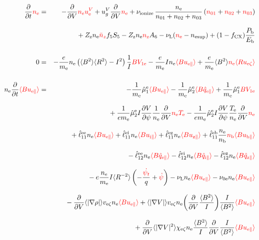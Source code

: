 \documentclass[11pt]{article}
\def\r#1{{\rm#1}}
\def\aves#1{\langle#1\rangle}
\def\dd#1#2{\frac{\partial #1}{\partial #2}}
\def\para{\parallel}
\def\ddV{\frac{\partial}{\partial V}}
\def\ddt{\frac{\partial}{\partial t}}
\def\psid{\dot{\psi}}
\def\psit{\psi_t}
\def\psitd{\dot{\psit}}
\def\me{m_\r{e}}
\def\nee{n_\r{e}}
\def\nz{n_\r{z}}
\def\nb{n_\r{b}}
\def\Te{T_\r{e}}
\def\Zz{Z_\r{z}}
\def\uzt#1{u_{\r{#1}\zeta}}
\def\upara#1{u_{\r{#1}\para}}
\def\qhatpara#1{\hat{q}_{\r{#1}\para}}
\def\uV#1{u_\r{#1}^V}
\def\ugV{u_{g}^V}
\def\chis#1{\chi_\r{#1}}
\def\nun#1{\nu_\r{0#1}}
\def\nsup#1{n_\r{#1sup}}
\def\bri{\aves{B^2}\aves{R^2} - I^2}
\def\Pb{P_\r{b}}
\def\Eb{E_\r{b}}
\def\nna{n_{01}}
\def\nnb{n_{02}}
\def\nnc{n_{03}}
\def\nnz{\bar{n}_{z}}
\def\fCX{f_\r{CX}}
\def\nuL{\nu_\r{L}}
\def\nuion{\nu_\r{ionize}}
\def\red#1{\textcolor{red}{#1}}
\begin{document}
%
\begin{eqnarray}
  \ddt \red{\nee}  &=&
%
  - \ddV \red{\nee\uV{e}}
%
  + \ugV \ddV \red{\nee}
%
  + \nuion\, \frac{\nee}{\nna + \nnb + \nnc}\, (\red{\nna} + \red{\nnb}
  + \red{\nnc})
\nonumber\\[3mm]&&{}
%
  + \Zz \nee \red{\nnz} f_5S_5 - \Zz \nee \red{\nz} A_6
%
  - \nuL (\red{\nee} - \nsup{e})
%
  + (1 - \fCX) \frac{\Pb}{\Eb}
\\[5mm]
  0 &=&
%
  - \frac{e}{\me} \nee \left( \bri \right) \frac{1}{I} \red{BV_{1\r{e}}}
%
  - \frac{e}{\me} I \nee \red{\aves{B\upara{e}}}
%
  + \frac{e}{\me} \aves{B^2} \red{\nee \aves{R\uzt{e}}}
\\[5mm]
  \nee \ddt \red{\aves{B \upara{e}}} &=&
%
  - \frac{1}{\me} \hat{\mu}_1^\r{e} \red{\aves{B \upara{e}}}
  - \frac{1}{\me} \hat{\mu}_2^\r{e} \red{\aves{B \qhatpara{e}}}
%
  + \frac{1}{\me} \hat{\mu}_1^\r{e} \red{BV_{1\r{e}}}
\nonumber\\[3mm]&&{}
%
  + \frac{1}{e\me} \hat{\mu}_2^\r{e} I \dd{V}{\psi} \frac{1}{\nee} \ddV
  \red{\nee \Te}
  - \frac{1}{e\me} \hat{\mu}_2^\r{e} I \dd{V}{\psi} \frac{\Te}{\nee} \ddV
  \red{\nee}
\nonumber\\[3mm]&&{}
%
  + \hat{\ell}_{11}^{\r{ee}} \nee \red{\aves{B \upara{e}}}
  + \hat{\ell}_{11}^{\r{ei}} \nee \red{\aves{B \upara{i}}}
  + \hat{\ell}_{11}^{\r{ez}} \nee \red{\aves{B \upara{z}}}
  + \hat{\ell}_{11}^{\r{eb}} \frac{\nee}{\nb} \red{\nb \aves{B \upara{b}}}
\nonumber\\[3mm]&&{}
%
  - \hat{\ell}_{12}^{\r{ee}} \nee \red{\aves{B \qhatpara{e}}}
  - \hat{\ell}_{12}^{\r{ei}} \nee \red{\aves{B \qhatpara{i}}}
  - \hat{\ell}_{12}^{\r{ez}} \nee \red{\aves{B \qhatpara{z}}}
\nonumber\\[3mm]&&{}
%
  - e \frac{\nee}{\me} I \aves{R^{-2}} \left( - \frac{\red{\psitd}}{q} + \red{\psid} \right)
%
%
  - \nuL \nee \red{\aves{B \upara{e}}}
%
  - \nun{e} \nee \red{\aves{B \upara{e}}}
\nonumber\\[3mm]&&{}
%
  - \ddV \aves{|\nabla \rho|} v_{\r{e}\zeta} \nee \red{\aves{B \upara{e}}}
%
  + \aves{|\nabla V|} v_{\r{e}\zeta} \nee 
  \biggl(\ddV \frac{\aves{B^2}}{I} \biggl) \frac{I}{\aves{B^2}} \red{\aves{B \upara{e}}}
\nonumber\\[3mm]&&{}
%
  + \ddV \aves{|\nabla V|^2} \chis{e\zeta} \nee
  \frac{\aves{B^2}}{I} \ddV \frac{I}{\aves{B^2}} \red{\aves{B \upara{e}}}

\end{eqnarray}
\end{document}
